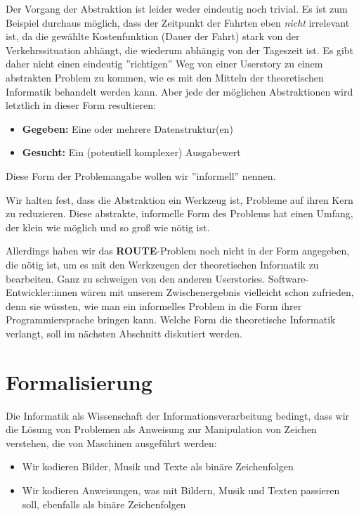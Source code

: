 Der Vorgang der Abstraktion ist leider weder eindeutig noch trivial.
Es ist zum Beispiel durchaus möglich,
dass der Zeitpunkt der Fahrten eben \emph{nicht} irrelevant ist,
da die gewählte Kostenfunktion (Dauer der Fahrt)
stark von der Verkehrssituation abhängt,
die wiederum abhängig von der Tageszeit ist.
Es gibt daher nicht einen eindeutig ''richtigen'' Weg von einer Userstory zu einem abstrakten Problem zu kommen,
wie es mit den Mitteln der theoretischen Informatik behandelt werden kann.
Aber jede der möglichen Abstraktionen wird letztlich in dieser Form resultieren:
\begin{itemize}
    \item \textbf{Gegeben:} Eine oder mehrere Datenstruktur(en)
    \item \textbf{Gesucht:} Ein (potentiell komplexer) Ausgabewert
\end{itemize}
Diese Form der Problemangabe wollen wir ''informell'' nennen.

Wir halten fest, dass die Abstraktion ein Werkzeug ist,
Probleme auf ihren Kern zu reduzieren.
Diese abstrakte, informelle Form des Problems hat einen Umfang, der klein wie möglich und so groß wie nötig ist.

Allerdings haben wir das \textbf{ROUTE}-Problem noch nicht in der Form angegeben,
die nötig ist, um es mit den Werkzeugen der theoretischen Informatik zu bearbeiten.
Ganz zu schweigen von den anderen Userstories.
Software-Entwickler:innen wären mit unserem Zwischenergebnis vielleicht schon zufrieden,
denn sie wüssten, wie man ein informelles Problem in die Form ihrer Programmiersprache bringen kann.
Welche Form die theoretische Informatik verlangt, soll im nächsten Abschnitt diskutiert werden.

\section{Formalisierung}

Die Informatik als Wissenschaft der Informationsverarbeitung bedingt,
dass wir die Lösung von Problemen als Anweisung zur Manipulation von Zeichen verstehen,
die von Maschinen ausgeführt werden:
\begin{itemize}
    \item Wir kodieren Bilder, Musik und Texte als binäre Zeichenfolgen
    \item Wir kodieren Anweisungen, was mit Bildern, Musik und Texten passieren soll, ebenfalls als binäre Zeichenfolgen
\end{itemize}

